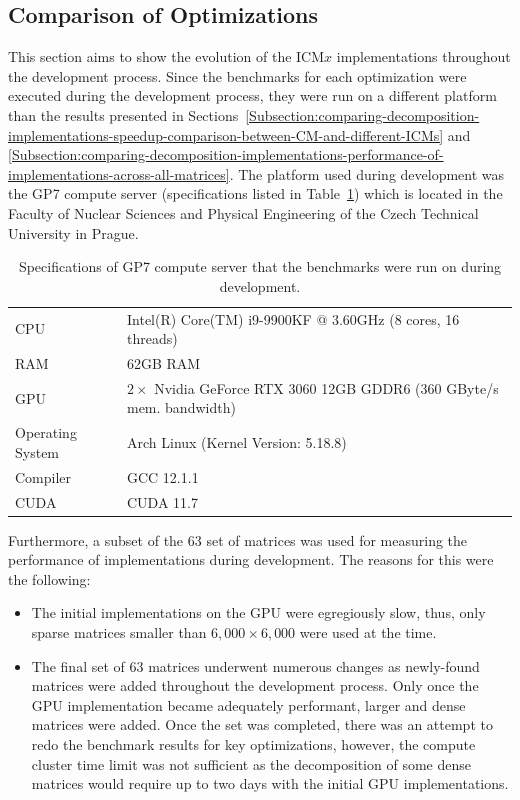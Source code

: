 \subsection{Comparison of Optimizations \TO}
This section aims to show the evolution of the ICM$ x $ implementations throughout the development process. Since the benchmarks for each optimization were executed during the development process, they were run on a different platform than the results presented in Sections~\ref{Subsection:comparing-decomposition-implementations-speedup-comparison-between-CM-and-different-ICMs} and \ref{Subsection:comparing-decomposition-implementations-performance-of-implementations-across-all-matrices}. The platform used during development was the GP7 compute server (specifications listed in Table~\ref{Table:comparing-decomposition-implementations-comparison-of-optimizations}) which is located in the Faculty of Nuclear Sciences and Physical Engineering of the Czech Technical University in Prague.

\begin{table}[ht!]
	\centering
	\begin{tabular}{|l|l|}
		\hline
		CPU              & Intel(R) Core(TM) i9-9900KF @ 3.60GHz (8 cores, 16 threads) \\
		RAM              & 62GB RAM \\
		GPU              & $ 2\times $ Nvidia GeForce RTX 3060 12GB GDDR6 (360 GByte/s mem. bandwidth) \\
		Operating System & Arch Linux (Kernel Version: 5.18.8) \\
		Compiler         & GCC 12.1.1 \\
		CUDA             & CUDA 11.7 \\ \hline
	\end{tabular}
	\caption{Specifications of GP7 compute server that the benchmarks were run on during development.}
	\label{Table:comparing-decomposition-implementations-comparison-of-optimizations}
\end{table}

Furthermore, a subset of the 63 set of matrices was used for measuring the performance of implementations during development. The reasons for this were the following:

\begin{itemize}
	\item The initial implementations on the GPU were egregiously slow, thus, only sparse matrices smaller than $ 6,000\times 6,000 $ were used at the time.
	\item The final set of 63 matrices underwent numerous changes as newly-found matrices were added throughout the development process. Only once the GPU implementation became adequately performant, larger and dense matrices were added. Once the set was completed, there was an attempt to redo the benchmark results for key optimizations, however, the compute cluster time limit was not sufficient as the decomposition of some dense matrices would require up to two days with the initial GPU implementations.
\end{itemize}

